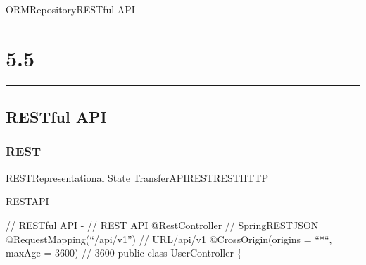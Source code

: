 ORMRepositoryRESTful API

\section{5.5}\label{section-34}

\begin{center}\rule{0.5\linewidth}{0.5pt}\end{center}

\subsection{RESTful API}\label{restful-api}

\subsubsection{REST}\label{rest}

RESTRepresentational State TransferAPIRESTRESTHTTP

RESTAPI

// RESTful API - // REST API @RestController // SpringRESTJSON
@RequestMapping(``/api/v1'') // URL/api/v1 @CrossOrigin(origins = ``*``,
maxAge = 3600) // 3600 public class UserController \{

